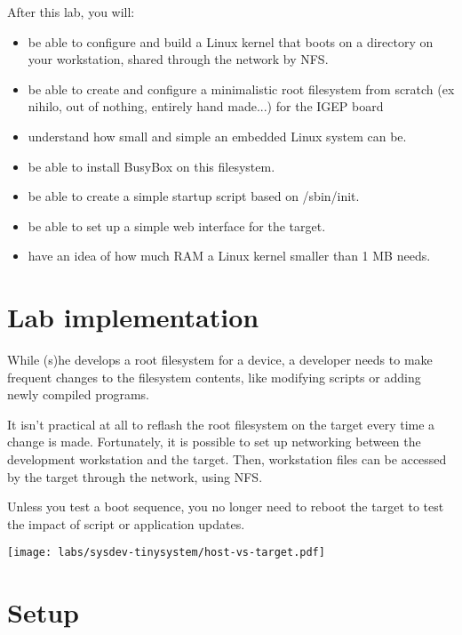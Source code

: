 
After this lab, you will:
\begin{itemize}
\item be able to configure and build a Linux kernel that boots on a
  directory on your workstation, shared through the network by NFS.
\item be able to create and configure a minimalistic root filesystem
  from scratch (ex nihilo, out of nothing, entirely hand made...) for
  the IGEP board
\item understand how small and simple an embedded Linux system can be.
\item be able to install BusyBox on this filesystem.
\item be able to create a simple startup script based on /sbin/init.
\item be able to set up a simple web interface for the target.
\item have an idea of how much RAM a Linux kernel smaller than 1 MB needs.
\end{itemize}

\section{Lab implementation}

While (s)he develops a root filesystem for a device, a developer needs
to make frequent changes to the filesystem contents, like modifying
scripts or adding newly compiled programs.

It isn't practical at all to reflash the root filesystem on the target
every time a change is made. Fortunately, it is possible to set up
networking between the development workstation and the target. Then,
workstation files can be accessed by the target through the network,
using NFS.

Unless you test a boot sequence, you no longer need to reboot the
target to test the impact of script or application updates.

\begin{center}
\texttt{[image: labs/sysdev-tinysystem/host-vs-target.pdf]}
\end{center}

\section{Setup}

